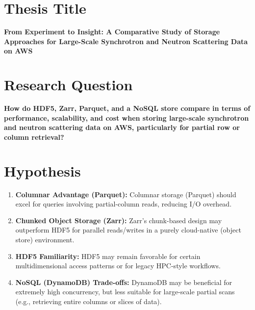 \documentclass{article}
\begin{document}
\section{Thesis Title}
\textbf{From Experiment to Insight: A Comparative Study of Storage Approaches for Large-Scale Synchrotron and Neutron Scattering Data on AWS}

\section{Research Question}
\textbf{How do HDF5, Zarr, Parquet, and a NoSQL store compare in terms of performance, scalability, and cost when storing large-scale synchrotron and neutron scattering data on AWS, particularly for partial row or column retrieval?}

\section{Hypothesis}
\begin{enumerate}
    \item \textbf{Columnar Advantage (Parquet):} Columnar storage (Parquet) should excel for queries involving partial-column reads, reducing I/O overhead.
    \item \textbf{Chunked Object Storage (Zarr):} Zarr’s chunk-based design may outperform HDF5 for parallel reads/writes in a purely cloud-native (object store) environment.
    \item \textbf{HDF5 Familiarity:} HDF5 may remain favorable for certain multidimensional access patterns or for legacy HPC-style workflows.
    \item \textbf{NoSQL (DynamoDB) Trade-offs:} DynamoDB may be beneficial for extremely high concurrency, but less suitable for large-scale partial scans (e.g., retrieving entire columns or slices of data).
\end{enumerate}
\end{document}
